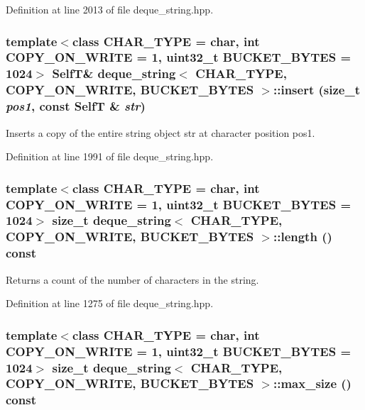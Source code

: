 Definition at line 2013 of file deque\_\-string.hpp.\hypertarget{classdeque__string_9a83bbe40adafff72391797edcce5b31}{
\subsubsection[{insert}]{\setlength{\rightskip}{0pt plus 5cm}template$<$class CHAR\_\-TYPE  = char, int COPY\_\-ON\_\-WRITE = 1, uint32\_\-t BUCKET\_\-BYTES = 1024$>$ {\bf SelfT}\& {\bf deque\_\-string}$<$ CHAR\_\-TYPE, COPY\_\-ON\_\-WRITE, BUCKET\_\-BYTES $>$::insert (size\_\-t {\em pos1}, \/  const {\bf SelfT} \& {\em str})}}
\label{classdeque__string_9a83bbe40adafff72391797edcce5b31}


Inserts a copy of the entire string object str at character position pos1. 

Definition at line 1991 of file deque\_\-string.hpp.\hypertarget{classdeque__string_4cc04b6ba64f69b943b7ece1aa1e0f80}{
\subsubsection[{length}]{\setlength{\rightskip}{0pt plus 5cm}template$<$class CHAR\_\-TYPE  = char, int COPY\_\-ON\_\-WRITE = 1, uint32\_\-t BUCKET\_\-BYTES = 1024$>$ size\_\-t {\bf deque\_\-string}$<$ CHAR\_\-TYPE, COPY\_\-ON\_\-WRITE, BUCKET\_\-BYTES $>$::length () const}}
\label{classdeque__string_4cc04b6ba64f69b943b7ece1aa1e0f80}


Returns a count of the number of characters in the string. 

Definition at line 1275 of file deque\_\-string.hpp.\hypertarget{classdeque__string_c2e1561b8bb76f37f0e0f060fe520982}{
\subsubsection[{max\_\-size}]{\setlength{\rightskip}{0pt plus 5cm}template$<$class CHAR\_\-TYPE  = char, int COPY\_\-ON\_\-WRITE = 1, uint32\_\-t BUCKET\_\-BYTES = 1024$>$ size\_\-t {\bf deque\_\-string}$<$ CHAR\_\-TYPE, COPY\_\-ON\_\-WRITE, BUCKET\_\-BYTES $>$::max\_\-size () const}}
\label{classdeque__string_c2e1561b8bb76f37f0e0f060fe520982}


